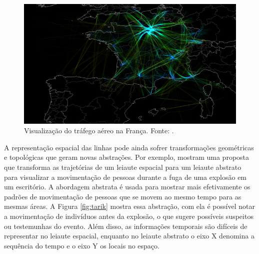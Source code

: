 \begin{description}
\begin{figure}[!htb]
  \centering
  \includegraphics[width=1\textwidth]{../figuras/air-traffic.png}
  \caption[Visualização do tráfego aéreo na França]{Visualização do tráfego aéreo na França. Fonte: \citet{Klein2013}.}
  \label{fig:air-traffic}
\end{figure}

  A representação espacial das linhas pode ainda sofrer transformações
geométricas e topológicas que geram novas abstrações. Por exemplo,
\citet{Tarik2009} mostram uma proposta que transforma as trajetórias de um
leiaute espacial para um leiaute abstrato para visualizar a movimentação de
pessoas durante a fuga de uma explosão em um escritório.  A abordagem abstrata
é usada para mostrar mais efetivamente os padrões de movimentação de pessoas
que se movem ao mesmo tempo para as mesmas áreas. A Figura \ref{fig:tarik}
mostra essa abstração, com ela é possível notar a movimentação de indivíduos
antes da explosão, o que sugere possíveis suspeitos ou testemunhas do evento.
Além disso, as informações temporais são difíceis de representar no leiaute
espacial, enquanto no leiaute abstrato o eixo X denomina a sequência do tempo e
o eixo Y os locais no espaço.


\end{description}
